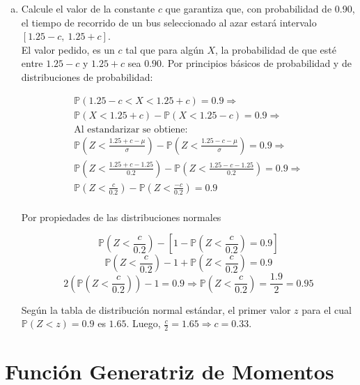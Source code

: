 \documentclass[11pt, spanish]{article}
\begin{document}
\begin{enumerate}[(a)]
\item Calcule el valor de la constante $c$ que garantiza que, con probabilidad de 0.90, el
tiempo de recorrido de un bus seleccionado al azar estará intervalo $\left[ 1.25 - c,\ 1.25 + c\right]$.\\

El valor pedido, es un $c$ tal que para algún $X$, la probabilidad de que esté entre $1.25 - c$ y $1.25 + c$ sea $0.90$. Por principios básicos de probabilidad y de distribuciones de probabilidad:

\begin{equation}
    \begin{aligned}
   \mathbb{P}\left(1.25 - c < X < 1.25 + c \right) = 0.9 \Rightarrow   \\
  \mathbb{P}\left(X < 1.25 + c\right) -   \mathbb{P}\left(X < 1.25 - c\right) = 0.9 \Rightarrow\\
  \mbox{Al estandarizar se obtiene:} \\
  \mathbb{P}\left(Z < \frac{1.25 + c - \mu}{\sigma} \right) - \mathbb{P}\left(Z < \frac{1.25 - c - \mu}{\sigma} \right) = 0.9 \Rightarrow \\
  \mathbb{P}\left(Z < \frac{1.25 + c - 1.25}{0.2} \right) - \mathbb{P}\left(Z < \frac{1.25 - c - 1.25}{0.2} \right) = 0.9 \Rightarrow  \\
  \mathbb{P}\left(Z < \frac{c}{0.2} \right) - \mathbb{P}\left(Z < \frac{- c}{0.2} \right) = 0.9 \\
\end{aligned}
\end{equation}

\pagebreak
Por propiedades de las distribuciones normales

$$  \mathbb{P}\left(Z < \frac{c}{0.2} \right) - \left[ 1 - \mathbb{P}\left(Z < \frac{c}{0.2} \right) = 0.9 \right] $$
$$  \mathbb{P}\left(Z < \frac{c}{0.2} \right) - 1 + \mathbb{P}\left(Z < \frac{c}{0.2} \right) = 0.9 $$
$$  2\left(\mathbb{P}\left(Z < \frac{c}{0.2} \right)\right) - 1  = 0.9 \Rightarrow \mathbb{P}\left(Z < \frac{c}{0.2} \right) = \frac{1.9}{2} = 0.95$$

Según la tabla de distribución normal estándar, el primer valor $z$ para el cual $\mathbb{P}\left(Z < z \right) = 0.9$ es $1.65$. Luego, $\frac{c}{2} = 1.65 \Rightarrow c = 0.33$.



\end{enumerate}

\pagebreak
\section{Función Generatriz de Momentos}
\end{document}
